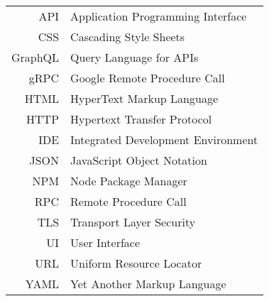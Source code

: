 \documentclass[english,master,unicode,oneside]{ctufit-thesis}
\theoremstyle{plain}
\theoremstyle{definition}
\theoremstyle{remark}
\numberwithin{theorem}{chapter}
\begin{document}
    \begin{tabular}{rl}
        API     & Application Programming Interface  \\
        CSS     & Cascading Style Sheets             \\
        GraphQL & Query Language for APIs            \\
        gRPC    & Google Remote Procedure Call       \\
        HTML    & HyperText Markup Language          \\
        HTTP    & Hypertext Transfer Protocol        \\
        IDE     & Integrated Development Environment \\
        JSON    & JavaScript Object Notation         \\
        NPM     & Node Package Manager               \\
        RPC     & Remote Procedure Call              \\
        TLS     & Transport Layer Security           \\
        UI      & User Interface                     \\
        URL     & Uniform Resource Locator           \\
        YAML    & Yet Another Markup Language        \\
    \end{tabular}

    \mainmatter\mainmatterinit %



    \appendix\appendixinit %


    \backmatter %

    \setcounter{biburllcpenalty}{7000}
    \setcounter{biburlucpenalty}{8000}
    \printbibliography %

\end{document}
